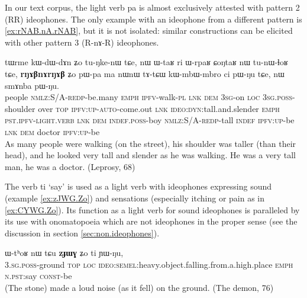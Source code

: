 \documentclass[oldfontcommands,oneside,a4paper,11pt]{article}
\newcommand{\ipa}[1]{{\phon \mbox{#1}}} %
\begin{document}
In our text corpus, the light verb \ipa{pa} is almost exclusively attested with pattern 2 (RR) ideophones. The only example with an ideophone from a different pattern is \ref{ex:rNAB.nA.rNAB}, but it is not isolated: similar constructions  can be elicited with other pattern 3 (R\ipa{-nɤ-}R) ideophones.
\begin{exe}
\ex \label{ex:rNAB.nA.rNAB}
\gll
\ipa{tɯrme}  	\ipa{kɯ-dɯ-dɤn}  	\ipa{ʑo}  	\ipa{tu-ŋke-nɯ}  	\ipa{tɕe,}  	\ipa{nɯ}  	\ipa{ɯ-taʁ}  	\ipa{ri}  	\ipa{ɯ-rpaʁ}  	\ipa{ɕoŋtaʁ}  	\ipa{nɯ}  	\ipa{tu-nɯ-ɬoʁ}  	\ipa{tɕe,}  	\ipa{\textbf{rŋɤβnɤrŋɤβ}}  	\ipa{ʑo}  	\ipa{pɯ-pa}  	\ipa{ma}  	\ipa{nɯnɯ}  	\ipa{tɤ-tɕɯ}  	\ipa{kɯ-mbɯ-mbro}  	\ipa{ci}  	\ipa{pɯ-ŋu}  	\ipa{tɕe,}  	\ipa{nɯ}  	\ipa{smɤnba}  	\ipa{pɯ-ŋu.}  \\
people \textsc{nmlz:S/A-redp}-be.many \textsc{emph} \textsc{ipfv}-walk-\textsc{pl} \textsc{lnk} \textsc{dem} \textsc{3sg}-on \textsc{loc} \textsc{3sg.poss}-shoulder over \textsc{top} \textsc{ipfv:up-auto}-come.out \textsc{lnk} \textsc{ideo:dyn}:tall.and.slender \textsc{emph} \textsc{pst.ipfv-light.verb} \textsc{lnk} \textsc{dem} \textsc{indef.poss}-boy \textsc{nmlz:S/A-redp}-tall \textsc{indef} \textsc{ipfv:up}-be \textsc{lnk} \textsc{dem} doctor \textsc{ipfv:up}-be \\
\glt As many people were walking (on the street), his shoulder was taller (than their  head), and he looked very tall and slender as he was walking. He was a very tall man, he was a doctor.
 (Leprosy, 68)
\end{exe}

The verb \ipa{ti}   `say' is used as a light verb with  ideophones expressing sound (example \ref{ex:zJWG.Zo}) and sensations (especially itching or pain as in \ref{ex:CYWG.Zo}). Its function as a light verb for sound ideophones is paralleled by its use with onomatopoeia which are not ideophones in the proper sense (see the discussion in  section \ref{sec:non.ideophones}).

\begin{exe}
\ex \label{ex:zJWG.Zo}
\gll
 \ipa{ɯ-tʰoʁ} 	\ipa{nɯ} 	\ipa{tɕu} 	\ipa{\textbf{zɟɯɣ}} 	\ipa{ʑo} 	\ipa{ti} 	\ipa{ɲɯ-ŋu,} \\
\textsc{3.sg.poss}-ground \textsc{top} \textsc{loc} \textsc{ideo:semel}:heavy.object.falling.from.a.high.place \textsc{emph} \textsc{n.pst}:say \textsc{const}-be \\
\glt (The stone) made a loud noise (as it fell) on the ground. (The demon, 76)
\end{exe}
 
\end{document}
